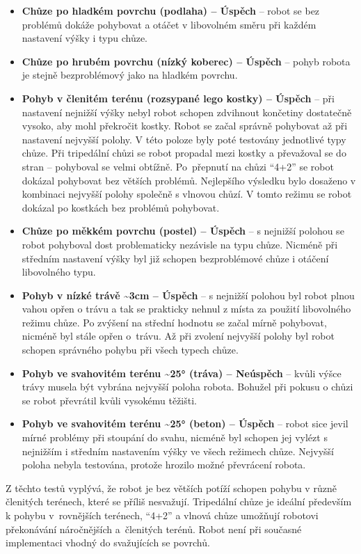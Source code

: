 \begin{itemize}
    \item \textbf{Chůze po hladkém povrchu (podlaha) -- Úspěch} -- robot se bez problémů dokáže pohybovat a otáčet v libovolném směru při každém nastavení výšky i typu chůze.
    \item \textbf{Chůze po hrubém povrchu (nízký koberec) -- Úspěch} -- pohyb robota je stejně bezproblémový jako na hladkém povrchu.
    \item \textbf{Pohyb v členitém terénu (rozsypané lego kostky) -- Úspěch} -- při nastavení nejnižší výšky nebyl robot schopen zdvihnout končetiny dostatečně vysoko, aby mohl překročit kostky. Robot se začal správně pohybovat až při nastavení nejvyšší polohy. V této poloze byly poté testovány jednotlivé typy chůze. Při tripedální chůzi se robot propadal mezi kostky a převažoval se do stran -- pohyboval se velmi obtížně. Po~přepnutí na chůzi ``4+2'' se robot dokázal pohybovat bez větších problémů. Nejlepšího výsledku bylo dosaženo v kombinaci nejvyšší polohy společně s vlnovou chůzí. V tomto režimu se robot dokázal po kostkách bez problémů pohybovat.
    \item \textbf{Chůze po měkkém povrchu (postel) -- Úspěch} -- s nejnižší polohou se robot pohyboval dost problematicky nezávisle na typu chůze. Nicméně při středním nastavení výšky byl již schopen bezproblémové chůze i otáčení libovolného typu.
    \item \textbf{Pohyb v nízké trávě \textasciitilde3cm -- Úspěch} -- s nejnižší polohou byl robot plnou vahou opřen o trávu a tak se prakticky nehnul z místa za použití libovolného režimu chůze. Po zvýšení na střední hodnotu se začal mírně pohybovat, nicméně byl stále opřen o~trávu. Až při zvolení nejvyšší polohy byl robot schopen správného pohybu při všech typech chůze.
    \item \textbf{Pohyb ve svahovitém terénu \textasciitilde25° (tráva) -- Neúspěch} -- kvůli výšce trávy musela být vybrána nejvyšší poloha robota. Bohužel při pokusu o chůzi se robot převrátil kvůli vysokému těžišti.
    \item \textbf{Pohyb ve svahovitém terénu \textasciitilde25° (beton) -- Úspěch} -- robot sice jevil mírné problémy při stoupání do svahu, nicméně byl schopen jej vylézt s nejnižším i středním nastavením výšky ve všech režimech chůze. Nejvyšší poloha nebyla testována, protože hrozilo možné převrácení robota.
\end{itemize}

Z těchto testů vyplývá, že robot je bez větších potíží schopen pohybu v různě členitých terénech, které se příliš nesvažují. Tripedální chůze je ideální především k pohybu v~rovnějších terénech, ``4+2'' a vlnová chůze umožňují robotovi překonávání náročnějších a~členitých terénů. Robot není při současné implementaci vhodný do svažujících se povrchů.


